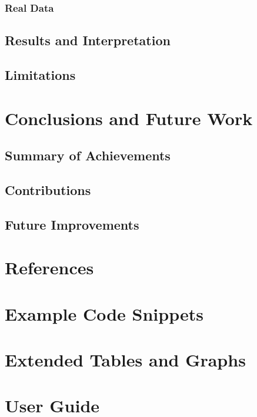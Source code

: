 \documentclass[a4paper,12pt]{article}
\begin{document}
\subsubsection{Real Data}
\subsection{Results and Interpretation}
\subsection{Limitations}

\section{Conclusions and Future Work}
\subsection{Summary of Achievements}
\subsection{Contributions}
\subsection{Future Improvements}

\section{References}

\appendix
\section{Example Code Snippets}
\section{Extended Tables and Graphs}
\section{User Guide}
\end{document}
